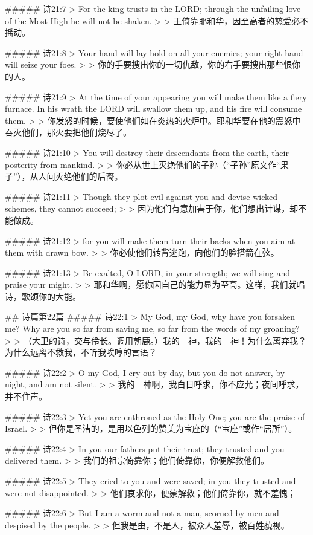 ##### 诗21:7
> For the king trusts in the LORD; through the unfailing love of the Most High he will not be shaken.
>
> 王倚靠耶和华，因至高者的慈爱必不摇动。


##### 诗21:8
> Your hand will lay hold on all your enemies; your right hand will seize your foes.
>
> 你的手要搜出你的一切仇敌，你的右手要搜出那些恨你的人。


##### 诗21:9
> At the time of your appearing you will make them like a fiery furnace. In his wrath the LORD will swallow them up, and his fire will consume them.
>
> 你发怒的时候，要使他们如在炎热的火炉中。耶和华要在他的震怒中吞灭他们，那火要把他们烧尽了。


##### 诗21:10
> You will destroy their descendants from the earth, their posterity from mankind.
>
> 你必从世上灭绝他们的子孙（“子孙”原文作“果子”），从人间灭绝他们的后裔。


##### 诗21:11
> Though they plot evil against you and devise wicked schemes, they cannot succeed;
>
> 因为他们有意加害于你，他们想出计谋，却不能做成。


##### 诗21:12
> for you will make them turn their backs when you aim at them with drawn bow.
>
> 你必使他们转背逃跑，向他们的脸搭箭在弦。


##### 诗21:13
> Be exalted, O LORD, in your strength; we will sing and praise your might.
>
> 耶和华啊，愿你因自己的能力显为至高。这样，我们就唱诗，歌颂你的大能。


## 诗篇第22篇
##### 诗22:1
> My God, my God, why have you forsaken me? Why are you so far from saving me, so far from the words of my groaning?
>
> （大卫的诗，交与伶长。调用朝鹿。）我的　神，我的　神！为什么离弃我？为什么远离不救我，不听我唉哼的言语？


##### 诗22:2
> O my God, I cry out by day, but you do not answer, by night, and am not silent.
>
> 我的　神啊，我白日呼求，你不应允；夜间呼求，并不住声。


##### 诗22:3
> Yet you are enthroned as the Holy One; you are the praise of Israel.
>
> 但你是圣洁的，是用以色列的赞美为宝座的（“宝座”或作“居所”）。


##### 诗22:4
> In you our fathers put their trust; they trusted and you delivered them.
>
> 我们的祖宗倚靠你；他们倚靠你，你便解救他们。


##### 诗22:5
> They cried to you and were saved; in you they trusted and were not disappointed.
>
> 他们哀求你，便蒙解救；他们倚靠你，就不羞愧；


##### 诗22:6
> But I am a worm and not a man, scorned by men and despised by the people.
>
> 但我是虫，不是人，被众人羞辱，被百姓藐视。


